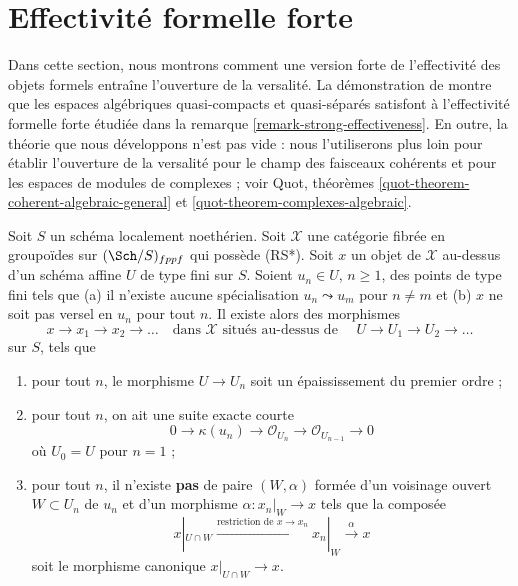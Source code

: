 \section{Effectivité formelle forte}
\label{section-strong-formal-effectiveness}

\noindent
Dans cette section, nous montrons comment une version forte de l'effectivité
des objets formels entraîne l'ouverture de la versalité. La démonstration de
\cite[Theorem 1.1]{Bhatt-Algebraize} montre que les espaces algébriques
quasi-compacts et quasi-séparés satisfont à l'effectivité formelle forte
étudiée dans la remarque \ref{remark-strong-effectiveness}. En outre, la
théorie que nous développons n'est pas vide : nous l'utiliserons plus loin
pour établir l'ouverture de la versalité pour le champ des faisceaux cohérents
et pour les espaces de modules de complexes ; voir Quot, théorèmes
\ref{quot-theorem-coherent-algebraic-general} et
\ref{quot-theorem-complexes-algebraic}.

\begin{lemma}
\label{lemma-infinite-sequence-pre}
Soit $S$ un schéma localement noethérien. Soit $\mathcal{X}$ une catégorie
fibrée en groupoïdes sur $(\Sch/S)_{fppf}$ qui possède (RS*).
Soit $x$ un objet de $\mathcal{X}$ au-dessus d'un schéma affine $U$ de type
fini sur $S$. Soient $u_n \in U$, $n \geq 1$, des points de type fini tels que
(a) il n'existe aucune spécialisation $u_n \leadsto u_m$ pour $n \not = m$ et
(b) $x$ ne soit pas versel en $u_n$ pour tout $n$. Il existe alors des morphismes
$$
x \to x_1 \to x_2 \to \ldots
\quad\text{dans }\mathcal{X}\text{ situés au-dessus de }\quad
U \to U_1 \to U_2 \to \ldots
$$
sur $S$, tels que
\begin{enumerate}
\item pour tout $n$, le morphisme $U \to U_n$ soit un épaississement du
premier ordre ;
\item pour tout $n$, on ait une suite exacte courte
$$
0 \to \kappa(u_n) \to \mathcal{O}_{U_n} \to \mathcal{O}_{U_{n - 1}} \to 0
$$
où $U_0 = U$ pour $n = 1$ ;
\item pour tout $n$, il n'existe {\bf pas} de paire $(W, \alpha)$ formée
d'un voisinage ouvert $W \subset U_n$ de $u_n$ et d'un morphisme
$\alpha : x_n|_W \to x$ tels que la composée
$$
x|_{U \cap W} \xrightarrow{\text{restriction de }x \to x_n}
x_n|_W \xrightarrow{\alpha} x
$$
soit le morphisme canonique $x|_{U \cap W} \to x$.
\end{enumerate}
\end{lemma}

